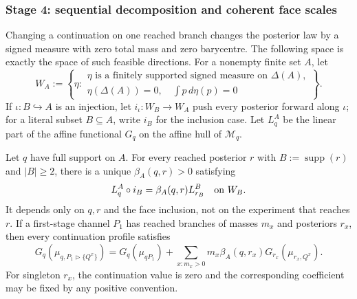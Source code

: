 \subsubsection{Stage 4: sequential decomposition and coherent face scales}

Changing a continuation on one reached branch changes the posterior law by a
signed measure with zero total mass and zero barycentre.  The following space
is exactly the space of such feasible directions.
For a nonempty finite set $A$, let
\[
 W_A:=\left\{\eta:
 \begin{array}{l}
 \eta\text{ is a finitely supported signed measure on }\Delta(A),\\[-2pt]
 \eta(\Delta(A))=0,\quad \displaystyle\int p\,d\eta(p)=0
 \end{array}\right\}.
\]
If $\iota:B\hookrightarrow A$ is an injection, let
$i_\iota:W_B\to W_A$ push every posterior forward along $\iota$; for a
literal subset $B\subseteq A$, write $i_B$ for the inclusion case.  Let
$L_q^A$ be the linear part of the affine functional $G_q$ on the affine hull
of $\mathcal M_q$.

\begin{lemma}
\label{pt:lem:branchagg}
Let $q$ have full support on $A$.  For every reached posterior $r$ with
$B:=\operatorname{supp}(r)$ and $|B|\ge2$, there is a unique
$\beta_A(q,r)>0$ satisfying
\begin{equation}
 L_q^A\circ i_B=\beta_A(q,r)L_{r_B}^B
 \quad\hbox{on }W_B.
\label{pt:eq:branch-linear}
\end{equation}
It depends only on $q,r$ and the face inclusion, not on the experiment that
reaches $r$.  If a first-stage channel $P_1$ has reached branches of masses
$m_x$ and posteriors $r_x$, then every continuation profile satisfies
\begin{equation}
 G_q(\mu_{q,P_1\triangleright\{Q^x\}})
 =G_q(\mu_{qP_1})+
 \sum_{x:m_x>0}m_x\beta_A(q,r_x)
 G_{r_x}(\mu_{r_x,Q^x}).
\tag{BA}\label{pt:eq:branchaggregation}
\end{equation}
For singleton $r_x$, the continuation value is zero and the corresponding
coefficient may be fixed by any positive convention.
\end{lemma}

